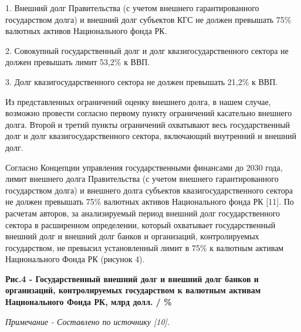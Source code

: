 \begin{multicols}{2}
1. Внешний долг Правительства (с учетом внешнего гарантированного
государством долга) и внешний долг субъектов КГС не должен превышать
75\% валютных активов Национального фонда РК.

2. Совокупный государственный долг и долг квазигосударственного сектора
не должен превышать лимит 53,2\% к ВВП.

3. Долг квазигосударственного сектора не должен превышать 21,2\% к ВВП.

Из представленных ограничений оценку внешнего долга, в нашем случае,
возможно провести согласно первому пункту ограничений касательно
внешнего долга. Второй и третий пункты ограничений охватывают весь
государственный долг и долг квазигосударственного сектора, включающий
внутренний и внешний долг.

Согласно Концепции управления государственными финансами до 2030 года,
лимит внешнего долга Правительства (с учетом внешнего гарантированного
государством долга) и внешнего долга субъектов квазигосударственного
сектора не должен превышать 75\% валютных активов Национального фонда РК
{[}11{]}. По расчетам авторов, за анализируемый период внешний долг
государственного сектора в расширенном определении, который охватывает
государственный внешний долг и внешний долг банков и организаций,
контролируемых государством, не превысил установленный лимит в 75\% к
валютным активам Национального Фонда РК (рисунок 4).
\end{multicols}

{\bfseries Рис.4 - Государственный внешний долг и внешний долг банков и организаций, контролируемых государством к валютным активам Национального Фонда РК, млрд долл. / \%}

\emph{Примечание - Составлено по источнику {[}10{]}.}

